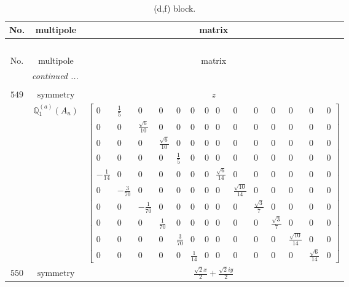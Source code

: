 \documentclass[fleqn,8pt,landscape]{jsarticle}
\begin{document}
\begin{longtable}{ccc}
\caption{(d,f) block.}
 \\
 \hline \hline
No. & multipole & matrix \\ \hline \endfirsthead

\multicolumn{2}{l}{\tablename\ \thetable{}} \\
 \hline \hline
No. & multipole & matrix \\ \hline \endhead

 \hline \hline
\multicolumn{2}{r}{\footnotesize\it continued ...} \\ \endfoot

 \hline \hline
\multicolumn{2}{r}{} \\ \endlastfoot

$ 549 $ & $ \text{symmetry} $ & $ z $ \\
$  $ & $ \mathbb{Q}_{1}^{(a)}(A_{u}) $ & $ \begin{bmatrix} 0 & \frac{1}{5} & 0 & 0 & 0 & 0 & 0 & 0 & 0 & 0 & 0 & 0 & 0 & 0 \\ 0 & 0 & \frac{\sqrt{6}}{10} & 0 & 0 & 0 & 0 & 0 & 0 & 0 & 0 & 0 & 0 & 0 \\ 0 & 0 & 0 & \frac{\sqrt{6}}{10} & 0 & 0 & 0 & 0 & 0 & 0 & 0 & 0 & 0 & 0 \\ 0 & 0 & 0 & 0 & \frac{1}{5} & 0 & 0 & 0 & 0 & 0 & 0 & 0 & 0 & 0 \\ - \frac{1}{14} & 0 & 0 & 0 & 0 & 0 & 0 & \frac{\sqrt{6}}{14} & 0 & 0 & 0 & 0 & 0 & 0 \\ 0 & - \frac{3}{70} & 0 & 0 & 0 & 0 & 0 & 0 & \frac{\sqrt{10}}{14} & 0 & 0 & 0 & 0 & 0 \\ 0 & 0 & - \frac{1}{70} & 0 & 0 & 0 & 0 & 0 & 0 & \frac{\sqrt{3}}{7} & 0 & 0 & 0 & 0 \\ 0 & 0 & 0 & \frac{1}{70} & 0 & 0 & 0 & 0 & 0 & 0 & \frac{\sqrt{3}}{7} & 0 & 0 & 0 \\ 0 & 0 & 0 & 0 & \frac{3}{70} & 0 & 0 & 0 & 0 & 0 & 0 & \frac{\sqrt{10}}{14} & 0 & 0 \\ 0 & 0 & 0 & 0 & 0 & \frac{1}{14} & 0 & 0 & 0 & 0 & 0 & 0 & \frac{\sqrt{6}}{14} & 0 \end{bmatrix} $ \\ \hline
$ 550 $ & $ \text{symmetry} $ & $ \frac{\sqrt{2} x}{2} + \frac{\sqrt{2} i y}{2} $ \\

\end{longtable}
\end{document}
